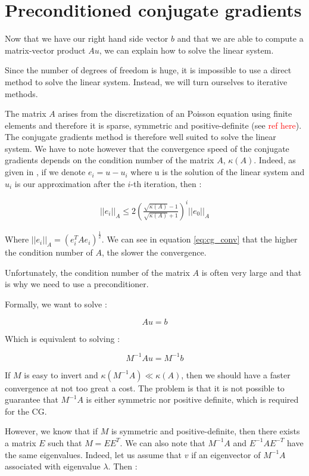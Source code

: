 \section{Preconditioned conjugate gradients}

Now that we have our right hand side vector $b$ and that we are able to compute a matrix-vector product $Au$, we can explain how to solve the linear system. 

Since the number of degrees of freedom is huge, it is impossible to use a direct method to solve the linear system. Instead, we will turn ourselves to iterative methods. 

The matrix $A$ arises from the discretization of an Poisson equation using finite elements and therefore it is sparse, symmetric and positive-definite (see \textcolor{red}{ref here}). The conjugate gradients method is therefore well suited to solve the linear system. We have to note however that the convergence speed of the conjugate gradients depends on the condition number of the matrix $A$, $\kappa(A)$. Indeed, as given in \cite{conj_grad}, if we denote $e_i = u-u_i$ where u is the solution of the linear system and $u_i$ is our approximation after the $i$-th iteration, then : 

\begin{align}
||e_i||_A \leq 2 \left(\frac{\sqrt{\kappa(A)}-1}{\sqrt{\kappa(A)}+1}\right)^i ||e_0||_A \label{eq:cg_conv}
\end{align}


Where $||e_i||_A = \left(e_i^TAe_i\right)^\frac{1}{2}$. We can see in equation \ref{eq:cg_conv} that the higher the condition number of $A$, the slower the convergence.  

Unfortunately, the condition number of the matrix $A$ is often very large and that is why we need to use a preconditioner. 

Formally, we want to solve : 

$$Au=b$$

Which is equivalent to solving : 

$$M^{-1}A u = M^{-1}b$$

If $M$ is easy to invert and $\kappa(M^{-1}A) \ll \kappa(A)$, then we should have a faster convergence at not too great a cost. The problem is that it is not possible to guarantee that $M^{-1}A$ is either symmetric nor positive definite, which is required for the CG.

However, we know that if $M$ is symmetric and positive-definite, then there exists a matrix $E$ such that $M = EE^T$. We can also note that $M^{-1}A$ and $E^{-1}AE^{-T}$ have the same eigenvalues. Indeed, let us assume that $v$ if an eigenvector of $M^{-1}A$ associated with eigenvalue $\lambda$. Then :

